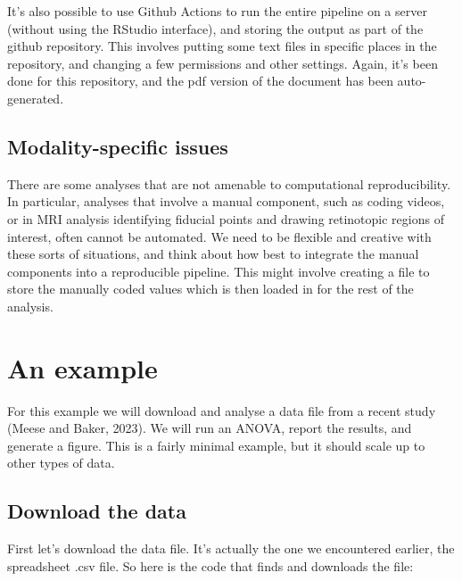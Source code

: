 \documentclass[
]{article}
\begin{document}
It's also possible to use Github Actions to run the entire pipeline on a server (without using the RStudio interface), and storing the output as part of the github repository. This involves putting some text files in specific places in the repository, and changing a few permissions and other settings. Again, it's been done for this repository, and the pdf version of the document has been auto-generated.

\hypertarget{modality-specific-issues}{%
\subsection{Modality-specific issues}\label{modality-specific-issues}}

There are some analyses that are not amenable to computational reproducibility. In particular, analyses that involve a manual component, such as coding videos, or in MRI analysis identifying fiducial points and drawing retinotopic regions of interest, often cannot be automated. We need to be flexible and creative with these sorts of situations, and think about how best to integrate the manual components into a reproducible pipeline. This might involve creating a file to store the manually coded values which is then loaded in for the rest of the analysis.

\hypertarget{an-example}{%
\section{An example}\label{an-example}}

For this example we will download and analyse a data file from a recent study (Meese and Baker, 2023). We will run an ANOVA, report the results, and generate a figure. This is a fairly minimal example, but it should scale up to other types of data.

\hypertarget{download-the-data}{%
\subsection{Download the data}\label{download-the-data}}

First let's download the data file. It's actually the one we encountered earlier, the spreadsheet .csv file. So here is the code that finds and downloads the file:
\end{document}
